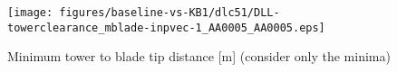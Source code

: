 \begin{figure}[!ht]
\begin{center}
	\texttt{[image: figures/baseline-vs-KB1/dlc51/DLL-towerclearance\_mblade-inpvec-1\_AA0005\_AA0005.eps]}
\end{center}
\caption{Minimum tower to blade tip distance [m] (consider only the minima)}
\label{fig:baseline-vs-KB1:dlc51:tower-tip-clearance}
\end{figure}

